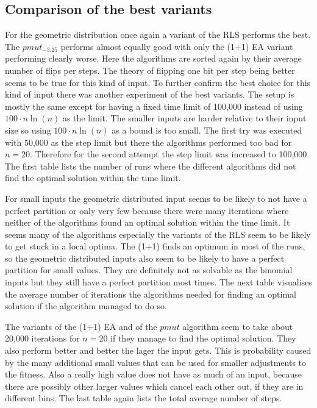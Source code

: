 \subsection{Comparison of the best variants}




For the geometric distribution once again a variant of the RLS performs the best.
The $pmut_{-3.25}$ performs almost equally good with only the (1+1) EA variant performing clearly worse.
Here the algorithms are sorted again by their average number of flips per steps.
The theory of flipping one bit per step being better seems to be true for this kind of input.\newline
To further confirm the best choice for this kind of input there was another experiment of the best variants.
The setup is mostly the same except for having a fixed time limit of 100,000 instead of using $100 \cdot n\ln(n)$ as the limit.
The smaller inputs are harder relative to their input size so using $100 \cdot n\ln(n)$ as a bound is too small.
The first try was executed with 50,000 as the step limit but there the algorithms performed too bad for $n=20$.
Therefore for the second attempt the step limit was increased to 100,000.
The first table lists the number of runs where the different algorithms did not find the optimal solution within the time limit.



For small inputs the geometric distributed input seems to be likely to not have a perfect partition or only very few because there were many iterations where neither of the algorithms found an optimal solution within the time limit.
It seems many of the algorithms especially the variants of the RLS seem to be likely to get stuck in a local optima.
The (1+1) finds an optimum in most of the runs, so the geometric distributed inputs also seem to be likely to have a perfect partition for small values.
They are definitely not as solvable as the binomial inputs but they still have a perfect partition most times.
The next table visualises the average number of iterations the algorithms needed for finding an optimal solution if the algorithm managed to do so.



The variants of the (1+1) EA and of the $pmut$ algorithm seem to take about 20,000 iterations for $n=20$ if they manage to find the optimal solution.
They also perform better and better the lager the input gets.
This is probability caused by the many additional small values that can be used for smaller adjustments to the fitness.
Also a really high value does not have as much of an input, because there are possibly other larger values which cancel each other out, if they are in different bins.
The last table again lists the total average number of steps.

